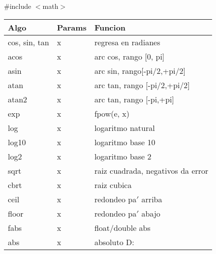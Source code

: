 \#include $<$math$>$ \\
\begin{tabular}{|l|l|p{8cm}|} \hline
\textbf{Algo}         & \textbf{Params} & \textbf{Funcion}                           \\\hline
cos, sin, tan & x      & regresa en radianes               \\\hline
acos          & x      & arc cos,  rango {[}0, pi{]}       \\\hline
asin          & x      & arc sin, rango{[}-pi/2,+pi/2{]}   \\\hline
atan          & x      & arc tan, rango {[}-pi/2,+pi/2{]}  \\\hline
atan2         & x      & arc tan, rango {[}-pi,+pi{]}      \\\hline
exp           & x      & fpow(e, x)                        \\\hline
log           & x      & logaritmo natural                 \\\hline
log10         & x      & logaritmo base 10                 \\\hline
log2          & x      & logaritmo base 2                  \\\hline
sqrt          & x      & raiz cuadrada, negativos da error \\\hline
cbrt          & x      & raiz cubica                       \\\hline
ceil          & x      & redondeo pa$'$ arriba               \\\hline
floor         & x      & redondeo pa$'$ abajo                \\\hline
fabs          & x      & float/double abs                  \\\hline
abs           & x      & absoluto D:                       \\\hline
\end{tabular}

